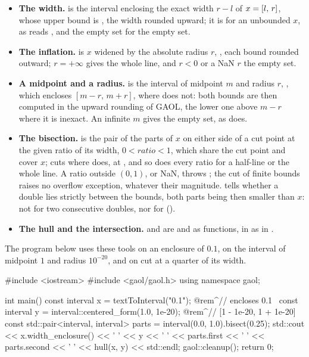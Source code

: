 \begin{itemize}
\item[$\bullet$] \textbf{The width.}  is the
  interval  enclosing the exact width $r-l$ of
  $x=[l,\,r]$, whose upper bound is , the width rounded
  upward; it is  for an unbounded $x$, as
   reads , and the empty set for the empty
  set.
\item[$\bullet$] \textbf{The inflation.}  is $x$ widened by
  the absolute radius $r$, , each bound rounded
  outward; $r=+\infty$ gives the whole line, and $r<0$ or a NaN $r$ the empty
  set.
\item[$\bullet$] \textbf{A midpoint and a radius.} 
  is the interval of midpoint $m$ and radius $r$,
  , which encloses $[m-r,\,m+r]$, where
   does not: both bounds are then computed in the
  upward rounding of GAOL, the lower one above $m-r$ where it is inexact. An
  infinite $m$ gives the empty set, as  does.
\item[$\bullet$] \textbf{The bisection.}  is the pair of
  the parts of $x$ on either side of a cut point at the given ratio of its
  width, $0<\mathit{ratio}<1$, which share the cut point and cover $x$;
   cuts where  does, at , and
  so does every ratio for a half-line or the whole line. A ratio outside
  $(0,1)$, or NaN, throws ; the cut of finite bounds
  raises no overflow exception, whatever their magnitude. 
  tells whether a double lies strictly between the bounds, both parts being
  then smaller than $x$: not for two consecutive doubles, nor for
   ().
\item[$\bullet$] \textbf{The hull and the intersection.}  and
   are  and  as functions, in
   as in .
\end{itemize}

\begin{Ex}\label{ex:tools}
The program below uses these tools on an enclosure of $0.1$, on the interval
of midpoint $1$ and radius $10^{-20}$, and on  cut at a quarter of
its width.
\begin{example}
#include <iostream>
#include <gaol/gaol.h>
using namespace gaol;

int main()
{
  const interval x = textToInterval("0.1");               @rem^// encloses 0.1~
  const interval y = interval::centered_form(1.0, 1e-20); @rem^// [1 - 1e-20, 1 + 1e-20]~
  const std::pair<interval, interval> parts = interval(0.0, 1.0).bisect(0.25);
  std::cout << x.width_enclosure() << ' ' << y << ' ' << parts.first << ' '
            << parts.second << ' ' << hull(x, y) << std::endl;
  gaol::cleanup();
  return 0;
}
\end{example}
\end{Ex}

